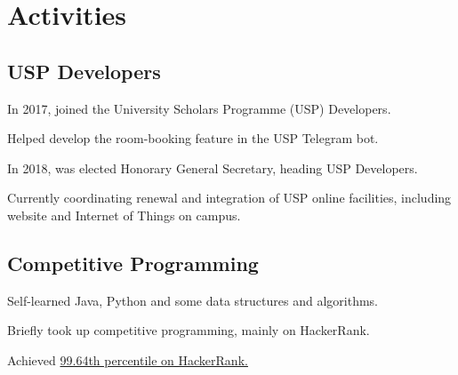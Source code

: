 \documentclass[]{deedy-resume-openfont}
\begin{document}
\begin{minipage}[t]{0.66\textwidth}

\section{Activities}
\subsection{USP Developers}
\begin{tightemize}
\item In 2017, joined the University Scholars Programme (USP) Developers.
\item Helped develop the room-booking feature in the USP Telegram bot.
\item In 2018, was elected Honorary General Secretary, heading USP Developers. 
\item Currently coordinating renewal and integration of USP online facilities, including website and Internet of Things on campus.
\end{tightemize}
\sectionsep

\subsection{Competitive Programming}
\begin{tightemize}
\item Self-learned Java, Python and some data structures and algorithms.
\item Briefly took up competitive programming, mainly on HackerRank.
\item Achieved \href{https://www.hackerrank.com/chikchengyao}{99.64th percentile on HackerRank.}
\end{tightemize}
\sectionsep



%
%

\end{minipage} 
\end{document}
